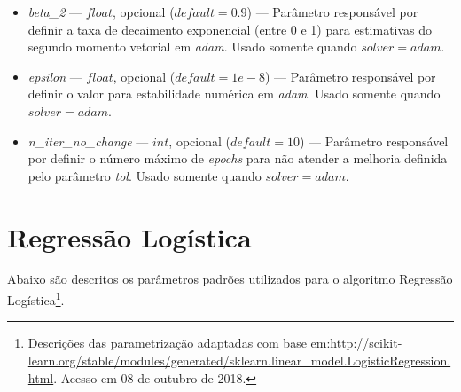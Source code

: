 \documentclass[
	12pt,				%
	oneside,			%
	a4paper,			%
	english,			%
	brazil				%
	]{abntex2ppgsi}
\begin{document}
{{\begin{apendicesenv}
\begin{itemize}
\item \textit{beta\_2} --- $float$, opcional ($default=0.9$) --- Parâmetro responsável por definir a taxa de decaimento exponencial (entre 0 e 1) para estimativas do segundo momento vetorial em \textit{adam}. Usado somente quando $solver=adam$.
\item \textit{epsilon} --- $float$, opcional ($default=1e-8$) --- Parâmetro responsável por definir o valor para estabilidade numérica em \textit{adam}. Usado somente quando $solver=adam$.
\item \textit{n\_iter\_no\_change} --- $int$, opcional ($default=10$) --- Parâmetro responsável por definir o número máximo de \textit{epochs} para não atender a melhoria definida pelo parâmetro \textit{tol}. Usado somente quando $solver=adam$.
\end{itemize}

\section{Regressão Logística}

Abaixo são descritos os parâmetros padrões utilizados para o algoritmo Regressão Logística\footnote{Descrições das parametrização adaptadas com base em:\url{http://scikit-learn.org/stable/modules/generated/sklearn.linear_model.LogisticRegression.html}. Acesso em 08 de outubro de 2018.}.


\end{apendicesenv}}}
\end{document}
